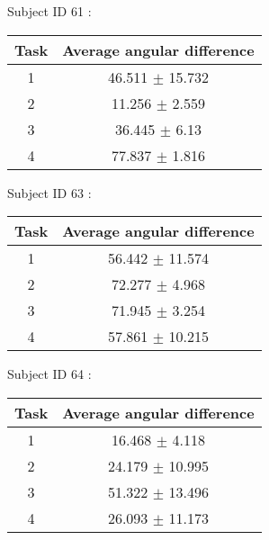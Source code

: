 \documentclass[12pt]{article}
\begin{document}
\par Subject ID  61 :
\begin{center}
\begin{tabular}{|c|c|}
\hline
 Task & Average angular difference \\ \hline
1  &  46.511 $\pm$ 15.732 \\
2  &  11.256 $\pm$ 2.559 \\
3  &  36.445 $\pm$ 6.13 \\
4  &  77.837 $\pm$ 1.816 \\
\hline
\end{tabular}
\end{center}

\par Subject ID  63 :
\begin{center}
\begin{tabular}{|c|c|}
\hline
 Task & Average angular difference \\ \hline
1  &  56.442 $\pm$ 11.574 \\
2  &  72.277 $\pm$ 4.968 \\
3  &  71.945 $\pm$ 3.254 \\
4  &  57.861 $\pm$ 10.215 \\
\hline
\end{tabular}
\end{center}

\par Subject ID  64 :
\begin{center}
\begin{tabular}{|c|c|}
\hline
 Task & Average angular difference \\ \hline
1  &  16.468 $\pm$ 4.118 \\
2  &  24.179 $\pm$ 10.995 \\
3  &  51.322 $\pm$ 13.496 \\
4  &  26.093 $\pm$ 11.173 \\
\hline
\end{tabular}
\end{center}
\end{document}
